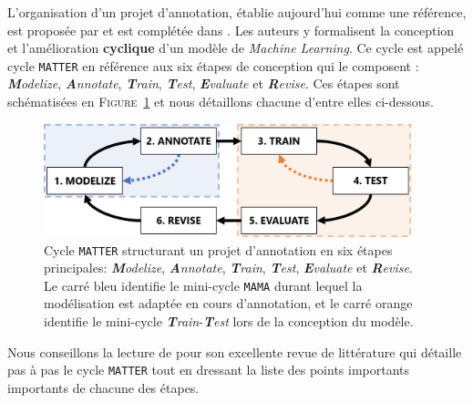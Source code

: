 		L'organisation d'un projet d'annotation, établie aujourd'hui comme une référence, est proposée par \cite{pustejovsky-stubbs:2012:natural-language-annotation} et est complétée dans \cite{stubbs:2013:methodology-using-professional}.
		Les auteurs y formalisent la conception et l'amélioration \textbf{cyclique} d'un modèle de \textit{Machine Learning}.
		Ce cycle est appelé cycle \texttt{MATTER} en référence aux six étapes de conception qui le composent : \textit{\textbf{M}odelize}, \textit{\textbf{A}nnotate}, \textit{\textbf{T}rain}, \textit{\textbf{T}est}, \textit{\textbf{E}valuate} et \textit{\textbf{R}evise}.
		Ces étapes sont schématisées en \textsc{Figure~\ref{figure:2.2.1-ORGANISATION-ANNOTATION-ETAPES-CLES-MATTER}} et nous détaillons chacune d'entre elles ci-dessous.
		\begin{figure}[!htb]
			\centering
			\includegraphics[width=0.95\textwidth]{figures/etatdelart-pustejovsky-2012-cycle-matter-mama-tt}
			\caption{
				Cycle \texttt{MATTER} structurant un projet d'annotation en six étapes principales: \textit{\textbf{M}odelize}, \textit{\textbf{A}nnotate}, \textit{\textbf{T}rain}, \textit{\textbf{T}est}, \textit{\textbf{E}valuate} et \textit{\textbf{R}evise}. \\
				Le carré bleu identifie le mini-cycle \texttt{MAMA} durant lequel la modélisation est adaptée en cours d'annotation,
				et le carré orange identifie le mini-cycle \textit{\textbf{T}rain}-\textit{\textbf{T}est} lors de la conception du modèle.
			}
			\label{figure:2.2.1-ORGANISATION-ANNOTATION-ETAPES-CLES-MATTER}
		\end{figure}
		\begin{leftBarAuthorOpinion}
			Nous conseillons la lecture de \cite{finlayson-erjavec:2016:overview-annotation-creation} pour son excellente revue de littérature qui détaille pas à pas le cycle \texttt{MATTER} tout en dressant la liste des points importants importants de chacune des étapes.
		\end{leftBarAuthorOpinion}
		

